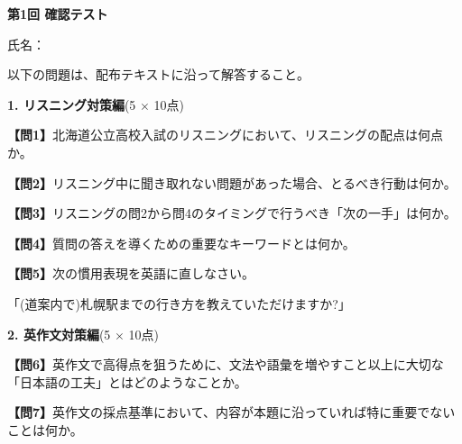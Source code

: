 
\begin{center}
{\LARGE\textbf{第1回 確認テスト}}
\end{center}

\vspace{0.4em}
\begin{flushright}
氏名：\underline{\hspace{15em}}
\end{flushright}

\vspace{0.5em}
\noindent 以下の問題は、配布テキストに沿って解答すること。

\vspace{0.5em}
\noindent\textbf{1. リスニング対策編}(5 $\times$ 10点)

\noindent\textbf{【問1】}北海道公立高校入試のリスニングにおいて、リスニングの配点は何点か。

\testblank[35点]{10em}
\vfill

\noindent\textbf{【問2】}リスニング中に聞き取れない問題があった場合、とるべき行動は何か。

\vfill

\noindent\textbf{【問3】}リスニングの問2から問4のタイミングで行うべき「次の一手」は何か。

\vfill

\noindent\textbf{【問4】}質問の答えを導くための重要なキーワードとは何か。

\vfill

\noindent\textbf{【問5】}次の慣用表現を英語に直しなさい。

「(道案内で)札幌駅までの行き方を教えていただけますか?」

\vfill

\noindent\textbf{2. 英作文対策編}(5 $\times$ 10点)

\noindent\textbf{【問6】}英作文で高得点を狙うために、文法や語彙を増やすこと以上に大切な「日本語の工夫」とはどのようなことか。

\vfill

\noindent\textbf{【問7】}英作文の採点基準において、内容が本題に沿っていれば特に重要でないことは何か。

\vfill

